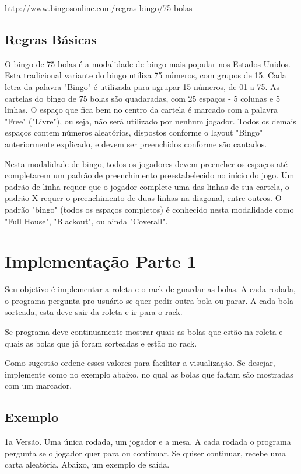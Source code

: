 \documentclass[12pt]{article}
\begin{document}
\url{http://www.bingosonline.com/regras-bingo/75-bolas}

\subsection{Regras Básicas}

O bingo de 75 bolas é a modalidade de bingo mais popular nos Estados Unidos. Esta tradicional variante do bingo utiliza 75 números, com grupos de 15. Cada letra da palavra "Bingo" é utilizada para agrupar 15 números, de 01 a 75. As cartelas do bingo de 75 bolas são quadaradas, com 25 espaços - 5 colunas e 5 linhas. O espaço que fica bem no centro da cartela é marcado com a palavra "Free" ("Livre"), ou seja, não será utilizado por nenhum jogador. Todos os demais espaços contem números aleatórios, dispostos conforme o layout "Bingo" anteriormente explicado, e devem ser preenchidos conforme são cantados.

Nesta modalidade de bingo, todos os jogadores devem preencher os espaços até completarem um padrão de preenchimento preestabelecido no início do jogo. Um padrão de linha requer que o jogador complete uma das linhas de sua cartela, o padrão X requer o preenchimento de duas linhas na diagonal, entre outros. O padrão "bingo" (todos os espaços completos) é conhecido nesta modalidade como "Full House", "Blackout", ou ainda "Coverall".

\section{Implementação Parte 1}
Seu objetivo é implementar a roleta e o rack de guardar as bolas.
A cada rodada, o programa pergunta pro usuário se quer pedir outra bola ou parar.
A cada bola sorteada, esta deve sair da roleta e ir para o rack.

Se programa deve continuamente mostrar quais as bolas que estão na roleta 
e quais as bolas que já foram sorteadas e estão no rack.

Como sugestão ordene esses valores para facilitar a visualização. Se desejar, 
implemente como no exemplo abaixo, no qual as bolas que faltam são mostradas
com um marcador.

\subsection{Exemplo}

1a Versão. Uma única rodada, um jogador e a mesa. A cada rodada o programa pergunta se o jogador quer para ou continuar. Se quiser continuar, recebe uma carta aleatória. Abaixo, um exemplo de saída.
\end{document}
